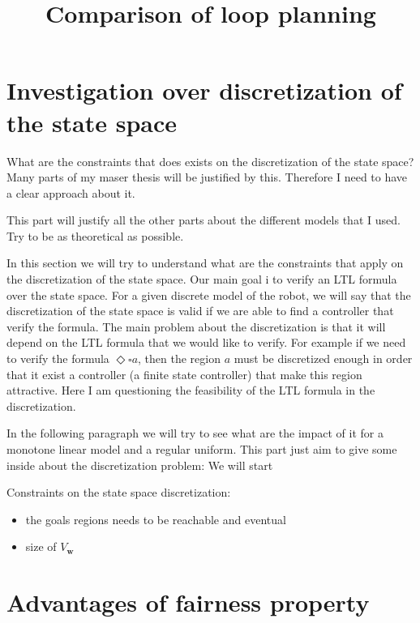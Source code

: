 \documentclass{article}
\begin{document}
\title{Comparison of loop planning}
\maketitle


\section{Investigation over discretization of the state space}
What are the constraints that does exists on the discretization of the state space?
Many parts of my maser thesis will be justified by this.
Therefore I need to have a clear approach about it.

This part will justify all the other parts about the different models that I used.
Try to be as theoretical as possible.
 

In this section we will try to understand what are the constraints that apply on the discretization of the state space.
Our main goal i to verify an LTL formula over the state space. For a given discrete model of the robot, we will say that the discretization of the state space is valid if we are able to find a controller that verify the formula.
The main problem about the discretization is that it will depend on the LTL formula that we would like to verify. For example if we need to verify the formula $\Diamond \square a$, then the region $a$ must be discretized enough in order that it exist a controller (a finite state controller) that make this region attractive.
Here I am questioning the feasibility of the LTL formula in the discretization.

In the following paragraph we will try to see what are the impact of it for a monotone linear model and a regular uniform.
This part just aim to give some inside about the discretization problem:
We will start

Constraints on the state space discretization:
\begin{itemize}[noitemsep,topsep=0pt,parsep=0pt,partopsep=0pt]
\item the goals regions needs to be reachable and eventual
\item size of $V_\mathbf{w}$
\end{itemize}

\section{Advantages of fairness property}
\end{document}
